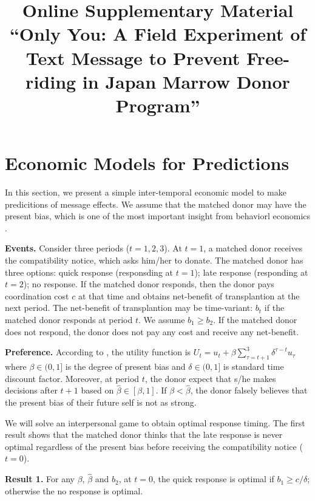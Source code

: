 \documentclass[
  12pt,
]{article}
\title{Online Supplementary Material
``Only You: A Field Experiment of Text Message to Prevent Free-riding in Japan Marrow Donor Program''}
\author{}
\date{\vspace{-2.5em}}
\begin{document}
\maketitle

{
\setcounter{tocdepth}{2}
\tableofcontents
}
\hypertarget{economic-models-for-predictions}{%
\section{Economic Models for Predictions}\label{economic-models-for-predictions}}

In this section, we present a simple inter-temporal economic model to make predicitions of message effects. We assume that the matched donor may have the present bias, which is one of the most important insight from behaviorl economics \citep{Laibson1997, ODonoghue2001}.

\noindent
\textbf{Events.} Consider three periods (\(t = 1, 2, 3\)). At \(t=1\), a matched donor receives the compatibility notice, which asks him/her to donate. The matched donor has three options: quick response (responsding at \(t=1\)); late response (responding at \(t=2\)); no response. If the matched donor responds, then the donor pays coordination cost \(c\) at that time and obtains net-benefit of transplantion at the next period. The net-benefit of transplantion may be time-variant: \(b_t\) if the matched donor responds at period \(t\). We assume \(b_1 \ge b_2\). If the matched donor does not respond, the donor does not pay any cost and receive any net-benefit.

\noindent
\textbf{Preference.} According to \citet{Laibson1997}, the utility function is \(U_t = u_t + \beta \sum_{\tau = t + 1}^{3} \delta^{\tau - t} u_{\tau}\) where \(\beta \in (0, 1]\) is the degree of present bias and \(\delta \in (0, 1]\) is standard time discount factor. Moreover, at period \(t\), the donor expect that s/he makes decisions after \(t + 1\) based on \(\hat{\beta} \in [\beta, 1]\). If \(\beta < \hat{\beta}\), the donor falsely believes that the present bias of their future self is not as strong.

We will solve an interpersonal game \citep{ODonoghue2001} to obtain optimal response timing. The first result shows that the matched donor thinks that the late response is never optimal regardless of the present bias before receiving the compatibility notice (\(t=0\)).

\noindent
\textbf{Result 1.} For any \(\beta\), \(\hat{\beta}\) and \(b_2\), at \(t = 0\), the quick response is optimal if \(b_1 \ge c/\delta\); otherwise the no response is optimal.
\end{document}
